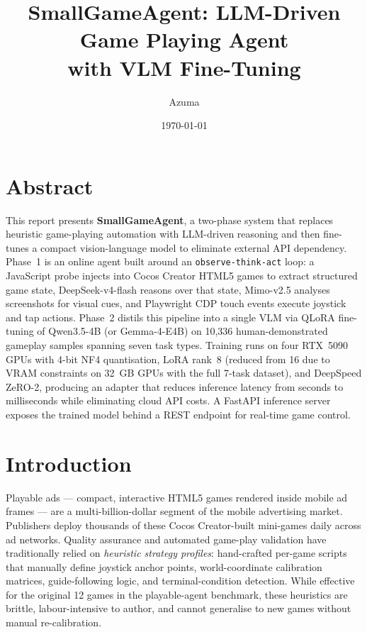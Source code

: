 \documentclass[11pt,a4paper]{article}
\title{SmallGameAgent: LLM-Driven Game Playing Agent\\with VLM Fine-Tuning}
\author{Azuma}
\date{\today}
\begin{document}
\maketitle

\section*{Abstract}

This report presents \textbf{SmallGameAgent}, a two-phase system that replaces heuristic game-playing automation with LLM-driven reasoning and then fine-tunes a compact vision-language model to eliminate external API dependency. Phase~1 is an online agent built around an \texttt{observe-think-act} loop: a JavaScript probe injects into Cocos Creator HTML5 games to extract structured game state, DeepSeek-v4-flash reasons over that state, Mimo-v2.5 analyses screenshots for visual cues, and Playwright CDP touch events execute joystick and tap actions. Phase~2 distils this pipeline into a single VLM via QLoRA fine-tuning of Qwen3.5-4B (or Gemma-4-E4B) on 10,336 human-demonstrated gameplay samples spanning seven task types. Training runs on four RTX~5090 GPUs with 4-bit NF4 quantisation, LoRA rank~8 (reduced from 16 due to VRAM constraints on 32~GB GPUs with the full 7-task dataset), and DeepSpeed ZeRO-2, producing an adapter that reduces inference latency from seconds to milliseconds while eliminating cloud API costs. A FastAPI inference server exposes the trained model behind a REST endpoint for real-time game control.

\section{Introduction}

Playable ads — compact, interactive HTML5 games rendered inside mobile ad frames — are a multi-billion-dollar segment of the mobile advertising market. Publishers deploy thousands of these Cocos Creator-built mini-games daily across ad networks. Quality assurance and automated game-play validation have traditionally relied on \emph{heuristic strategy profiles}: hand-crafted per-game scripts that manually define joystick anchor points, world-coordinate calibration matrices, guide-following logic, and terminal-condition detection. While effective for the original 12 games in the playable-agent benchmark, these heuristics are brittle, labour-intensive to author, and cannot generalise to new games without manual re-calibration.
\end{document}
